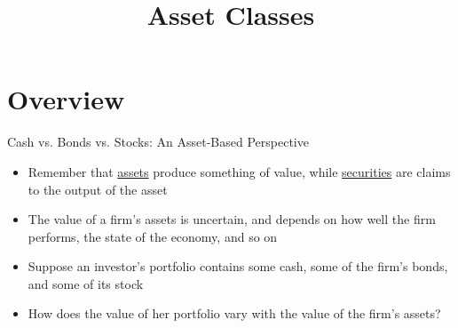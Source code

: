 \documentclass{beamer}
\title{Asset Classes}
\begin{document}
    \maketitle

\section{Overview}

\begin{frame}{Cash vs. Bonds vs. Stocks: An Asset-Based Perspective}
	\begin{itemize}
		\item Remember that \underline{assets} produce something of value, while \underline{securities} are claims to the output of the asset
		\item The value of a firm's assets is uncertain, and depends on how well the firm performs, the state of the economy, and so on
		\item Suppose an investor's portfolio contains some cash, some of the firm's bonds, and some of its stock
		\item How does the value of her portfolio vary with the value of the firm's assets?
	\end{itemize}
\end{frame}
\end{document}
